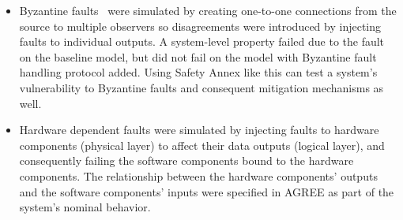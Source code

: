 \begin{itemize} 
	\item Byzantine faults~\cite{Driscoll-Byzantine-Fault} were simulated by creating one-to-one connections from the source to multiple observers so disagreements were introduced by injecting faults to individual outputs. A system-level property failed due to the fault on the baseline model, but did not fail on the model with Byzantine fault handling protocol added. Using Safety Annex like this can test a system's vulnerability to Byzantine faults and consequent mitigation mechanisms as well.
	
	\item Hardware dependent faults were simulated by injecting faults to hardware components (physical layer) to affect their data outputs (logical layer), and consequently failing the software components bound to the hardware components. The relationship between the hardware components' outputs and the software components' inputs were specified in AGREE as part of the system's nominal behavior.	
\end{itemize}


















